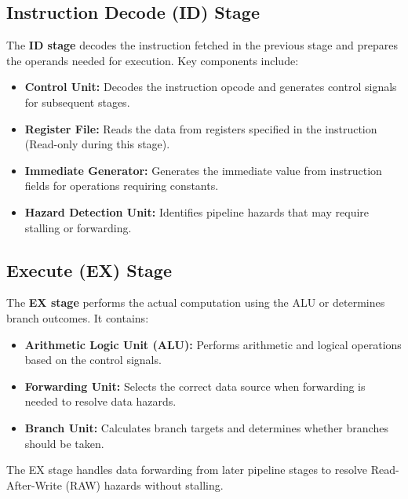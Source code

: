 \documentclass[conference]{IEEEtran}
\begin{document}
\subsection{Instruction Decode (ID) Stage}

The \textbf{ID stage} decodes the instruction fetched in the previous stage and prepares the operands needed for execution. Key components include:

\begin{itemize}
    \item \textbf{Control Unit:} Decodes the instruction opcode and generates control signals for subsequent stages.
    
    \item \textbf{Register File:} Reads the data from registers specified in the instruction (Read-only during this stage).
    
    \item \textbf{Immediate Generator:} Generates the immediate value from instruction fields for operations requiring constants.
    
    \item \textbf{Hazard Detection Unit:} Identifies pipeline hazards that may require stalling or forwarding.
\end{itemize}

\subsection{Execute (EX) Stage}

The \textbf{EX stage} performs the actual computation using the ALU or determines branch outcomes. It contains:

\begin{itemize}
    \item \textbf{Arithmetic Logic Unit (ALU):} Performs arithmetic and logical operations based on the control signals.
    
    \item \textbf{Forwarding Unit:} Selects the correct data source when forwarding is needed to resolve data hazards.
    
    \item \textbf{Branch Unit:} Calculates branch targets and determines whether branches should be taken.
\end{itemize}

The EX stage handles data forwarding from later pipeline stages to resolve Read-After-Write (RAW) hazards without stalling.
\end{document}
